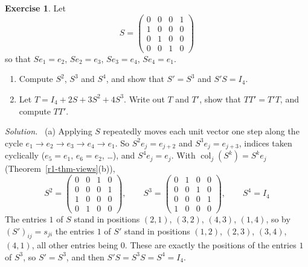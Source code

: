 \documentclass[12pt]{article}
\DeclareMathOperator{\col}{col}
\theoremstyle{definition}
\newtheorem{exercise}{Exercise}
\newenvironment{solution}{\par\noindent\textit{Solution.}\ }{\par\smallskip}
\begin{document}
\begin{exercise}\label{r1-ex-cyclic}
Let
\[
S=\begin{pmatrix}0&0&0&1\\1&0&0&0\\0&1&0&0\\0&0&1&0\end{pmatrix}
\]
so that \(Se_1=e_2\), \(Se_2=e_3\), \(Se_3=e_4\), \(Se_4=e_1\).
\begin{enumerate}
\item Compute \(S^2\), \(S^3\) and \(S^4\), and show that \(S'=S^3\) and \(S'S=I_4\).
\item Let \(T=I_4+2S+3S^2+4S^3\). Write out \(T\) and \(T'\), show that \(TT'=T'T\), and
compute \(TT'\).
\end{enumerate}
\end{exercise}
\begin{solution}
(a) Applying \(S\) repeatedly moves each unit vector one step along the cycle
\(e_1\to e_2\to e_3\to e_4\to e_1\). So \(S^2e_j=e_{j+2}\) and \(S^3e_j=e_{j+3}\), indices taken
cyclically (\(e_5=e_1\), \(e_6=e_2\), \dots), and \(S^4e_j=e_j\). With
\(\col_j(S^k)=S^ke_j\) (Theorem~\ref{r1-thm-views}(b)),
\[
S^2=\begin{pmatrix}0&0&1&0\\0&0&0&1\\1&0&0&0\\0&1&0&0\end{pmatrix},\qquad
S^3=\begin{pmatrix}0&1&0&0\\0&0&1&0\\0&0&0&1\\1&0&0&0\end{pmatrix},\qquad S^4=I_4
\]
The entries \(1\) of \(S\) stand in positions \((2,1)\), \((3,2)\), \((4,3)\), \((1,4)\), so
by \((S')_{ij}=s_{ji}\) the entries \(1\) of \(S'\) stand in positions \((1,2)\), \((2,3)\),
\((3,4)\), \((4,1)\), all other entries being \(0\). These are exactly the positions of the
entries \(1\) of \(S^3\), so \(S'=S^3\), and then \(S'S=S^3S=S^4=I_4\).


\end{solution}
\end{document}

